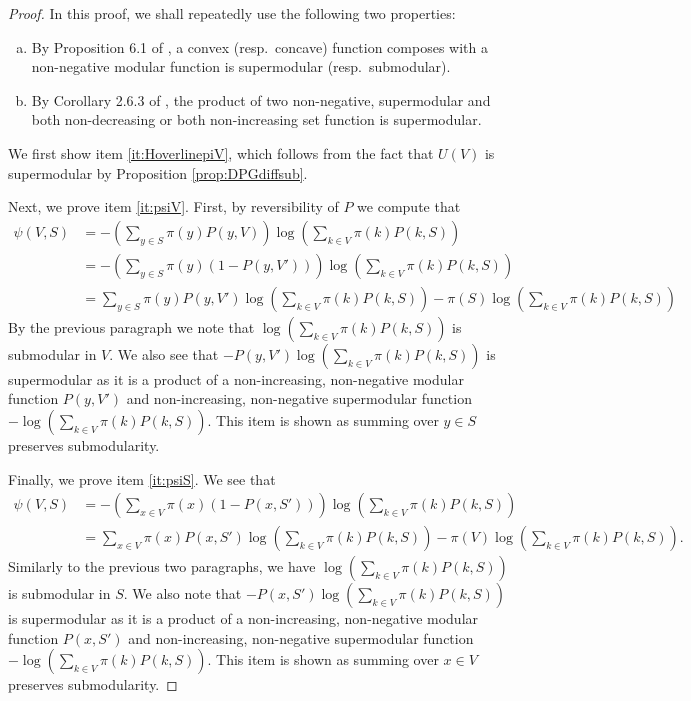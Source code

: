 \documentclass[EJP]{ejpecp} %
\begin{document}
\begin{proof}
    In this proof, we shall repeatedly use the following two properties:
    \begin{enumerate}[(a)]
        \item\label{it:convextransform} By Proposition 6.1 of \cite{bach2013learningsubmodularfunctionsconvex}, a convex (resp.~concave) function composes with a non-negative modular function is supermodular (resp.~submodular).

        \item\label{it:productsuper} By Corollary 2.6.3 of \cite{Topkis_1998}, the product of two non-negative, supermodular and both non-decreasing or both non-increasing set function is supermodular.
    \end{enumerate}

    We first show item \eqref{it:HoverlinepiV}, which follows from the fact that $U(V)$ is supermodular by Proposition \ref{prop:DPGdiffsub}.

    Next, we prove item \eqref{it:psiV}. First, by reversibility of $P$ we compute that
    \begin{align*}
        \psi(V,S) &= - \left(\sum_{y \in S} \pi(y) P(y,V)\right) \log\left(\sum_{k \in V} \pi(k)P(k,S)\right) \\
        &= - \left(\sum_{y \in S} \pi(y) (1-P(y,V'))\right) \log\left(\sum_{k \in V} \pi(k)P(k,S)\right) \\
        &= \sum_{y \in S} \pi(y) P(y,V') \log\left(\sum_{k \in V} \pi(k)P(k,S)\right) - \pi(S) \log\left(\sum_{k \in V} \pi(k)P(k,S)\right)
    \end{align*}
    By the previous paragraph we note that $\log\left(\sum_{k \in V} \pi(k)P(k,S)\right)$ is submodular in $V$. We also see that $-P(y,V') \log\left(\sum_{k \in V} \pi(k)P(k,S)\right)$ is supermodular as it is a product of a non-increasing, non-negative modular function $P(y,V')$ and non-increasing, non-negative supermodular function $-\log\left(\sum_{k \in V} \pi(k)P(k,S)\right)$. This item is shown as summing over $y \in S$ preserves submodularity.

    Finally, we prove item \eqref{it:psiS}. We see that
    \begin{align*}
        \psi(V,S) &= - \left(\sum_{x \in V} \pi(x) (1-P(x,S'))\right) \log\left(\sum_{k \in V} \pi(k)P(k,S)\right) \\
        &= \sum_{x \in V} \pi(x) P(x,S') \log\left(\sum_{k \in V} \pi(k)P(k,S)\right) - \pi(V) \log\left(\sum_{k \in V} \pi(k)P(k,S)\right).
    \end{align*}
    Similarly to the previous two paragraphs, we have $\log\left(\sum_{k \in V} \pi(k)P(k,S)\right)$ is submodular in $S$. We also note that $-P(x,S') \log\left(\sum_{k \in V} \pi(k)P(k,S)\right)$ is supermodular as it is a product of a non-increasing, non-negative modular function $P(x,S')$ and non-increasing, non-negative supermodular function $-\log\left(\sum_{k \in V} \pi(k)P(k,S)\right)$. This item is shown as summing over $x \in V$ preserves submodularity.
\end{proof}
\end{document}
